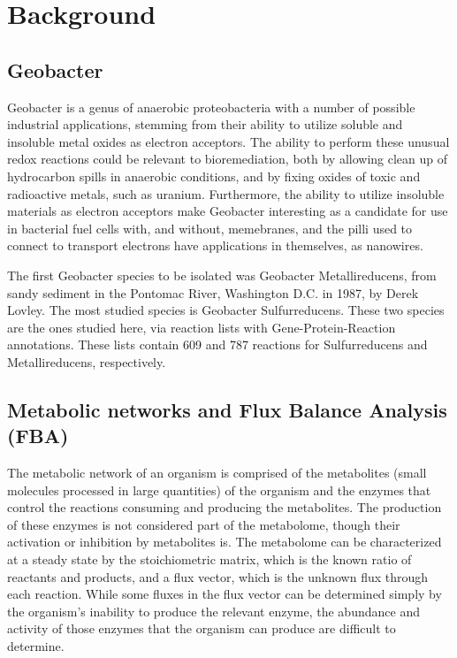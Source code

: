 \chapter{Background}
\section{Geobacter}
Geobacter is a genus of anaerobic proteobacteria with a number of possible industrial applications, stemming from their ability to utilize soluble and insoluble metal oxides as electron acceptors. 
The ability to perform these unusual redox reactions could be relevant to bioremediation, both by allowing clean up of hydrocarbon spills in anaerobic conditions, and by fixing oxides of toxic and radioactive metals, such as uranium. 
Furthermore, the ability to utilize insoluble materials as electron acceptors make Geobacter interesting as a candidate for use in bacterial fuel cells with, and without, memebranes, and the pilli used to connect to transport electrons have applications in themselves, as nanowires.

The first Geobacter species to be isolated was Geobacter Metallireducens, from sandy sediment in the Pontomac River, Washington D.C. in 1987, by Derek Lovley. 
The most studied species is Geobacter Sulfurreducens.
These two species are the ones studied here, via reaction lists with Gene-Protein-Reaction annotations.
These lists contain 609 and 787 reactions for Sulfurreducens and Metallireducens, respectively.

\section{Metabolic networks and Flux Balance Analysis (FBA)}
The metabolic network of an organism is comprised of the metabolites (small molecules processed in large quantities) of the organism and the enzymes that control the reactions consuming and producing the metabolites. 
The production of these enzymes is not considered part of the metabolome, though their activation or inhibition by metabolites is. 
The metabolome can be characterized at a steady state by the stoichiometric matrix, which is the known ratio of reactants and products, and a flux vector, which is the unknown flux through each reaction. 
While some fluxes in the flux vector can be determined simply by the organism's inability to produce the relevant enzyme, the abundance and activity of those enzymes that the organism can produce are difficult to determine. 

